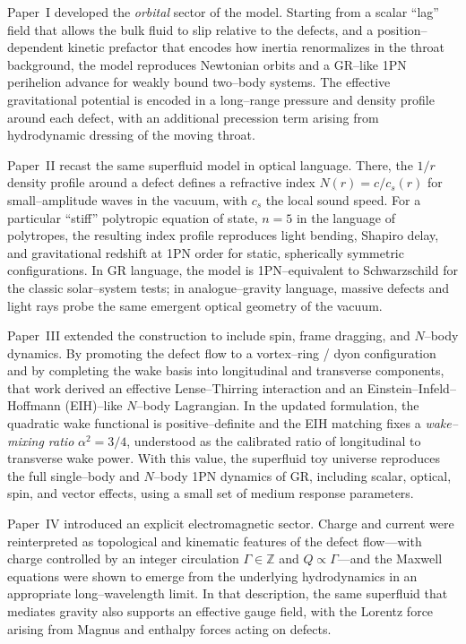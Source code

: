 \documentclass[11pt]{article}
\begin{document}
Paper~I developed the \emph{orbital} sector of the model.\cite{Norris:Paper1}
Starting from a scalar ``lag'' field that allows the bulk fluid to slip
relative to the defects, and a position--dependent kinetic prefactor that
encodes how inertia renormalizes in the throat background, the model
reproduces Newtonian orbits and a GR--like 1PN perihelion advance for
weakly bound two--body systems.  The effective gravitational potential is
encoded in a long--range pressure and density profile around each defect,
with an additional precession term arising from hydrodynamic dressing of the
moving throat.

Paper~II recast the same superfluid model in optical language.\cite{Norris:Paper2}
There, the $1/r$ density profile around a defect defines a refractive index
$N(r) = c/c_s(r)$ for small--amplitude waves in the vacuum, with $c_s$ the
local sound speed.  For a particular ``stiff'' polytropic equation of state,
$n=5$ in the language of polytropes, the resulting index profile reproduces
light bending, Shapiro delay, and gravitational redshift at 1PN order for
static, spherically symmetric configurations.  In GR language, the model is
1PN--equivalent to Schwarzschild for the classic solar--system tests; in
analogue--gravity language, massive defects and light rays probe the same
emergent optical geometry of the vacuum.

Paper~III extended the construction to include spin, frame dragging, and
$N$--body dynamics.\cite{Norris:Paper3}  By promoting the defect flow to a
vortex--ring / dyon configuration and by completing the wake basis into
longitudinal and transverse components, that work derived an effective
Lense--Thirring interaction and an Einstein--Infeld--Hoffmann (EIH)--like
$N$--body Lagrangian.  In the updated formulation, the quadratic wake functional
is positive--definite and the EIH matching fixes a \emph{wake--mixing ratio}
\(\alpha^2 = 3/4\), understood as the calibrated ratio of longitudinal to
transverse wake power.  With this value, the superfluid toy universe reproduces
the full single--body and $N$--body 1PN dynamics of GR, including scalar,
optical, spin, and vector effects, using a small set of medium response
parameters.

Paper~IV introduced an explicit electromagnetic sector.\cite{Norris:Paper4}
Charge and current were reinterpreted as topological and kinematic features
of the defect flow---with charge controlled by an integer circulation
\(\Gamma\in\mathbb{Z}\) and \(Q\propto\Gamma\)---and the Maxwell equations
were shown to emerge from the underlying hydrodynamics in an appropriate
long--wavelength limit.  In that description, the same superfluid that
mediates gravity also supports an effective gauge field, with the Lorentz
force arising from Magnus and enthalpy forces acting on defects.
\end{document}
